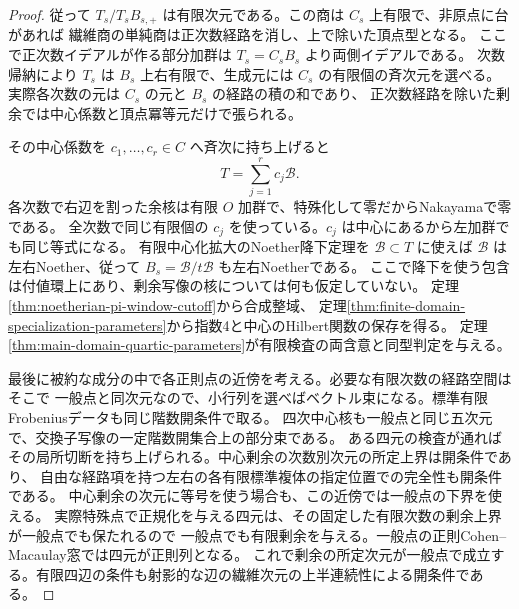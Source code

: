 \begin{proof}
従って $T_s/T_s B_{s,+}$ は有限次元である。この商は $C_s$ 上有限で、非原点に台があれば
繊維商の単純商は正次数経路を消し、上で除いた頂点型となる。
ここで正次数イデアルが作る部分加群は $T_s=C_s B_s$ より両側イデアルである。
次数帰納により $T_s$ は $B_s$ 上右有限で、生成元には $C_s$ の有限個の斉次元を選べる。
実際各次数の元は $C_s$ の元と $B_s$ の経路の積の和であり、
正次数経路を除いた剰余では中心係数と頂点冪等元だけで張られる。

その中心係数を $c_1,\ldots,c_r\in C$ へ斉次に持ち上げると
\[
                      T=\sum_{j=1}^r c_j\mathcal B .
\]
各次数で右辺を割った余核は有限 $O$ 加群で、特殊化して零だからNakayamaで零である。
全次数で同じ有限個の $c_j$ を使っている。$c_j$ は中心にあるから左加群でも同じ等式になる。
有限中心化拡大のNoether降下定理を $\mathcal B\subset T$ に使えば
$\mathcal B$ は左右Noether、従って $B_s=\mathcal B/t\mathcal B$ も左右Noetherである。
ここで降下を使う包含は付値環上にあり、剰余写像の核については何も仮定していない。
定理\ref{thm:noetherian-pi-window-cutoff}から合成整域、
定理\ref{thm:finite-domain-specialization-parameters}から指数4と中心のHilbert関数の保存を得る。
定理\ref{thm:main-domain-quartic-parameters}が有限検査の両含意と同型判定を与える。

最後に被約な成分の中で各正則点の近傍を考える。必要な有限次数の経路空間はそこで
一般点と同次元なので、小行列を選べばベクトル束になる。標準有限Frobeniusデータも同じ階数開条件で取る。
四次中心核も一般点と同じ五次元で、交換子写像の一定階数開集合上の部分束である。
ある四元の検査が通ればその局所切断を持ち上げられる。中心剰余の次数別次元の所定上界は開条件であり、
自由な経路項を持つ左右の各有限標準複体の指定位置での完全性も開条件である。
中心剰余の次元に等号を使う場合も、この近傍では一般点の下界を使える。
実際特殊点で正規化を与える四元は、その固定した有限次数の剰余上界が一般点でも保たれるので
一般点でも有限剰余を与える。一般点の正則Cohen--Macaulay窓では四元が正則列となる。
これで剰余の所定次元が一般点で成立する。有限四辺の条件も射影的な辺の繊維次元の上半連続性による開条件である。
\end{proof}
